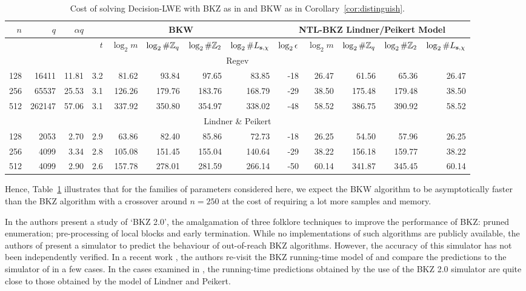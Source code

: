 \begin{table}[!htb]
\begin{center}
\begin{tabular}{|r|r|r||r|r|r|r|r||r|r|r|r|r|} 
\hline
$n$ & $q$ & $\alpha q$ & \multicolumn{5}{|c||}{BKW} &  \multicolumn{5}{|c|}{NTL-BKZ Lindner/Peikert Model}\\
\hline
\multicolumn{3}{|c||}{ }  &   $t$   & $\log_2 m$ & $\log_2 \#\mathbb{Z}_q$ & $\log_2 \#\mathbb{Z}_2$ & $\log_2 \#L_{\mathbf{s},\chi}$ & $\log_2 \epsilon$ & $\log_2 m$ & $\log_2 \#\mathbb{Z}_q$ & $\log_2 \#\mathbb{Z}_2$ & $\log_2 \#L_{\mathbf{s},\chi}$\\
\hline
\multicolumn{13}{|c|}{Regev \cite{regev:acm09}}\\
\hline
128 &  16411 & 11.81 & 3.2 &  81.62 &  93.84 &  97.65 &  83.85 & -18 &  26.47 &  61.56 &  65.36 &  26.47\\
256 &  65537 & 25.53 & 3.1 & 126.26 & 179.76 & 183.76 & 168.79 & -29 &  38.50 & 175.48 & 179.48 &  38.50\\
512 & 262147 & 57.06 & 3.1 & 337.92 & 350.80 & 354.97 & 338.02 & -48 &  58.52 & 386.75 & 390.92 &  58.52\\
\hline
\multicolumn{13}{|c|}{Lindner \& Peikert \cite{LindnerP10}}\\
\hline
128 &   2053 &  2.70 & 2.9 &  63.86 &  82.40 &  85.86 &  72.73 & -18 &  26.25 &  54.50 &  57.96 & 26.25\\
256 &   4099 &  3.34 & 2.8 & 105.08 & 151.45 & 155.04 & 140.64 & -29 &  38.22 & 156.18 & 159.77 & 38.22\\
512 &   4099 &  2.90 & 2.6 & 157.78 & 278.01 & 281.59 & 266.14 & -50 &  60.14 & 341.87 & 345.45 & 60.14\\
\hline
\end{tabular}
\end{center}
\caption{Cost of solving Decision-LWE with BKZ as in \cite{LindnerP10} and BKW as in Corollary~\ref{cor:distinguish}.}
\label{tab:concrete_Distinguishing}
\end{table}

Hence, Table~\ref{tab:concrete_Distinguishing} illustrates that for the families of parameters considered here, we expect the BKW algorithm to be asymptotically faster than the BKZ algorithm with a crossover around $n=250$ at the cost of requiring a lot more samples and memory.

In \cite{chen-nguyen:asiacrypt2011} the authors present a study of `BKZ 2.0', the amalgamation of three folklore techniques to improve the performance of BKZ: pruned enumeration; pre-processing of local blocks and early termination. While no implementations of such algorithms are publicly available, the authors of \cite{chen-nguyen:asiacrypt2011} present a simulator to predict the behaviour of out-of-reach BKZ algorithms. However, the accuracy of this simulator has not been independently verified. In a recent work \cite{DBLP:conf/ctrsa/LiuN13}, the authors re-visit the BKZ running-time model of \cite{LindnerP10} and compare the predictions to the simulator of \cite{chen-nguyen:asiacrypt2011} in a few cases. In the cases examined in \cite{DBLP:conf/ctrsa/LiuN13}, the running-time predictions obtained by the use of the BKZ 2.0 simulator are quite close to those obtained by the model of Lindner and Peikert.

